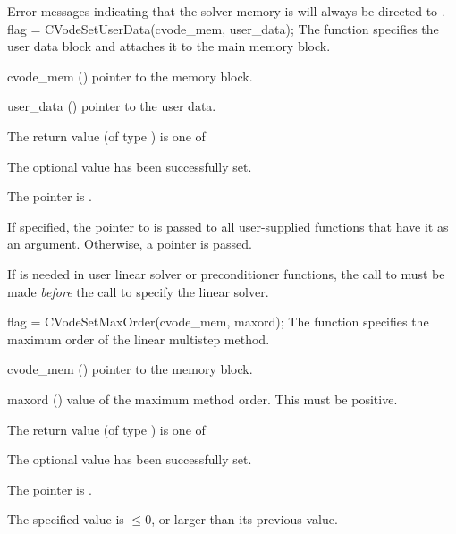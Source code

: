 {
  Error messages indicating that the {\cvode} solver memory is  will 
  always be directed to .
}
{
  flag = CVodeSetUserData(cvode\_mem, user\_data);
}
{
  The function  specifies the user data block 
  and attaches it to the main {\cvode} memory block.
}
{
  \begin{args}
  \item[cvode\_mem] ()
    pointer to the {\cvode} memory block.
  \item[user\_data] ()
    pointer to the user data.
  \end{args}
}
{
  The return value  (of type ) is one of
  \begin{args}
  \item[\Id{CV\_SUCCESS}] 
    The optional value has been successfully set.
  \item[\Id{CV\_MEM\_NULL}]
    The  pointer is .
  \end{args}
}
{
  If specified, the pointer to  is passed to all user-supplied 
  functions that have it as an argument. Otherwise, a  pointer is passed.

  {\warn}If  is needed in user linear solver or preconditioner
   functions, the call to  must be made {\it before} the
   call to specify the linear solver.
}
{
flag = CVodeSetMaxOrder(cvode\_mem, maxord);
}
{
  The function  specifies the maximum order of the 
  linear multistep method.
}
{
  \begin{args}
  \item[cvode\_mem] ()
    pointer to the {\cvode} memory block.
  \item[maxord] ()
    value of the maximum method order.  This must be positive.
  \end{args}
}
{
  The return value  (of type ) is one of
  \begin{args}
  \item[\Id{CV\_SUCCESS}] 
    The optional value has been successfully set.
  \item[\Id{CV\_MEM\_NULL}]
    The  pointer is .
  \item[\Id{CV\_ILL\_INPUT}]
    The specified value  is $\leq 0$, or larger than 
    its previous value.
  \end{args}
}
